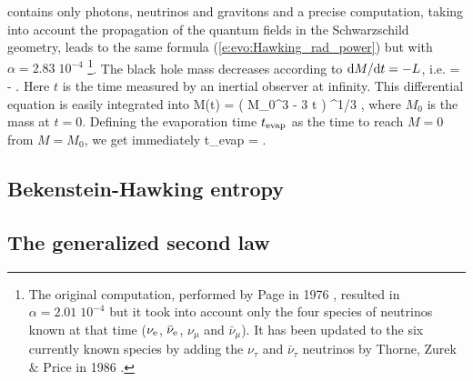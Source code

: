 contains only photons, neutrinos and gravitons and a precise computation, taking
into account the propagation of the quantum fields in the Schwarzschild geometry,
leads to the same formula (\ref{e:evo:Hawking_rad_power}) but with
$\alpha = 2.83\; 10^{-4}$ \cite{ThornZP86,Page76}\footnote{The original computation,
performed by Page in 1976 \cite{Page76}, resulted
in $\alpha=2.01\; 10^{-4}$ but it took into account only the four species
of neutrinos known at that time ($\nu_{\rm e}$, $\bar{\nu}_{\rm e}$, $\nu_\mu$ and
$\bar{\nu}_\mu$). It has been updated to the six currently known species by adding
the $\nu_\tau$ and $\bar{\nu}_\tau$ neutrinos by Thorne, Zurek \& Price in 1986 \cite{ThornZP86}.}.
The black hole mass decreases according to $\mathrm{d} M/\mathrm{d} t = - L$, i.e.
\be
     = - \alpha {} .
\ee
Here $t$ is the time measured by an inertial observer at infinity.
This differential equation is easily integrated into
\be
    M(t) = \left( M_0^3 - 3 \alpha \hbar t \right) ^{1/3} ,
\ee
where $M_0$ is the mass at $t=0$. Defining the evaporation time $t_{\rm evap}$
as the time to reach $M=0$ from $M = M_0$, we get immediately
\be
    t_{\rm evap} =  .
\ee

\subsection{Bekenstein-Hawking entropy}


\subsection{The generalized second law}

